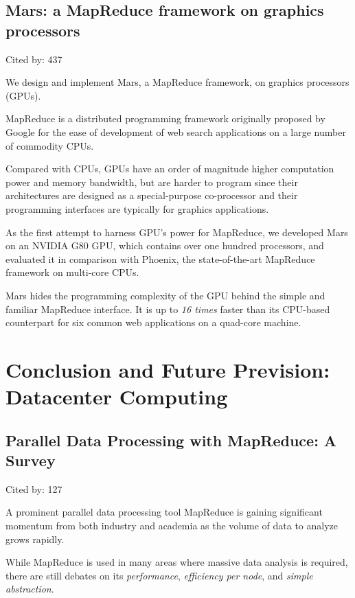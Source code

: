 \documentclass[a4paper,11pt]{article}
\begin{document}
{{\subsection*{Mars: a MapReduce framework on graphics processors}
{\color{cyan} {\color{magenta} Cited by: 437}

We design and implement 
{\color{black} Mars\cite{mars}}, 
a MapReduce framework, on graphics processors (GPUs). 

MapReduce is a distributed programming framework originally proposed by Google 
for the ease of development of web search applications 
on a large number of commodity CPUs. 

Compared with CPUs, 
GPUs have an order of magnitude higher computation power and memory bandwidth, 
but are harder to program 
since their architectures are designed as  a special-purpose co-processor and their 
programming interfaces are typically for graphics applications. 

As the first attempt to harness GPU's power for MapReduce, 
we 
developed Mars on an NVIDIA G80 GPU,
which contains over one hundred processors, and 
evaluated it in comparison with Phoenix, 
the state-of-the-art MapReduce framework on multi-core CPUs. 

Mars hides the programming complexity of the GPU behind the simple and familiar MapReduce interface.
It is up to {\color{red} \em 16 times} faster than its CPU-based counterpart 
for six common web applications on a quad-core machine.	

}

\section{Conclusion and Future Prevision: Datacenter Computing}

\subsection*{Parallel Data Processing with MapReduce: A Survey}
{\color{cyan} {\color{magenta} Cited by: 127}

A prominent parallel data processing tool MapReduce 
is gaining significant momentum 
from both industry and academia
as the volume of data to analyze grows rapidly. 

While MapReduce is used in many areas 
where massive data analysis is required,
there are still debates on its 
{\em performance}, 
{\em efficiency per node}, and 
{\em simple abstraction}. 

}}}
\end{document}
